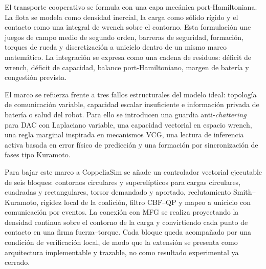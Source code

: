 \documentclass[12pt,a4paper]{article}
\begin{document}
\begin{viuabstract}
El transporte cooperativo se formula con una capa mecánica port-Hamiltoniana. La flota se
modela como densidad inercial, la carga como sólido rígido y el contacto como una integral
de wrench sobre el contorno. Esta formulación une juegos de campo medio de segundo orden,
barreras de seguridad, formación, torques de rueda y discretización a uniciclo dentro de
un mismo marco matemático. La integración se expresa como una cadena de residuos:
déficit de wrench, déficit de capacidad, balance port-Hamiltoniano, margen de batería y
congestión prevista.

El marco se refuerza frente a tres fallos estructurales del modelo ideal: topología de
comunicación variable, capacidad escalar insuficiente e información privada de batería o
salud del robot. Para ello se introducen una guardia anti-\emph{chattering} para DAC con
Laplaciano variable, una capacidad vectorial en espacio wrench, una regla marginal
inspirada en mecanismos VCG, una lectura de inferencia activa basada en error físico de
predicción y una formación por sincronización de fases tipo Kuramoto.

Para bajar este marco a CoppeliaSim se añade un controlador vectorial ejecutable de seis
bloques: contornos circulares y superelípticos para cargas circulares, cuadradas y
rectangulares, torsor demandado y aportado, reclutamiento Smith--Kuramoto, rigidez local
de la coalición, filtro CBF--QP y mapeo a uniciclo con comunicación por eventos. La
conexión con MFG se realiza proyectando la densidad continua sobre el contorno de la
carga y convirtiendo cada punto de contacto en una firma fuerza--torque. Cada bloque
queda acompañado por una condición de verificación local, de modo que la extensión se
presenta como arquitectura implementable y trazable, no como resultado experimental ya
cerrado.


\end{viuabstract}
\end{document}
